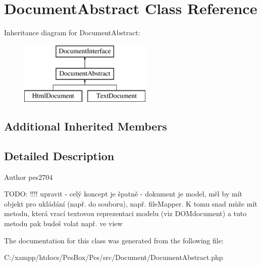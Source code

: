 \hypertarget{class_pes_1_1_document_1_1_document_abstract}{}\section{Document\+Abstract Class Reference}
\label{class_pes_1_1_document_1_1_document_abstract}
Inheritance diagram for Document\+Abstract\+:\begin{figure}[H]
\begin{center}
\leavevmode
\includegraphics[height=3.000000cm]{class_pes_1_1_document_1_1_document_abstract}
\end{center}
\end{figure}
\subsection*{Additional Inherited Members}


\subsection{Detailed Description}
\begin{DoxyAuthor}{Author}
pes2704
\end{DoxyAuthor}
T\+O\+DO\+: !!!! upravit -\/ celý koncept je špatně -\/ dokument je model, měl by mít objekt pro ukládání (např. do souboru), např. file\+Mapper. K tomu snad může mít metodu, která vrací textovou reprezentaci modelu (viz D\+O\+Mdocument) a tuto metodu pak budeš volat např. ve view 

The documentation for this class was generated from the following file\+:\begin{DoxyCompactItemize}
\item 
C\+:/xampp/htdocs/\+Pes\+Box/\+Pes/src/\+Document/Document\+Abstract.\+php\end{DoxyCompactItemize}
